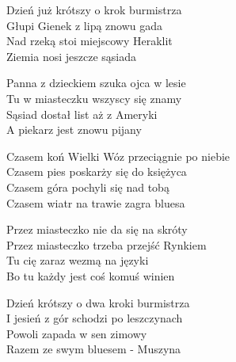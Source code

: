 \begin{text}
    Dzień już krótszy o krok burmistrza\\
    Głupi Gienek z lipą znowu gada\\
    Nad rzeką stoi miejscowy Heraklit\\
    Ziemia nosi jeszcze sąsiada

    Panna z dzieckiem szuka ojca w lesie\\
    Tu w miasteczku wszyscy się znamy\\
    Sąsiad dostał list aż z Ameryki\\
    A piekarz jest znowu pijany

    Czasem koń Wielki Wóz przeciągnie po niebie\\
    Czasem pies poskarży się do księżyca\\
    Czasem góra pochyli się nad tobą\\
    Czasem wiatr na trawie zagra bluesa

    Przez miasteczko nie da się na skróty\\
    Przez miasteczko trzeba przejść Rynkiem\\
    Tu cię zaraz wezmą na języki\\
    Bo tu każdy jest coś komuś winien

    Dzień krótszy o dwa kroki burmistrza\\
    I jesień z gór schodzi po leszczynach\\
    Powoli zapada w sen zimowy\\
    Razem ze swym bluesem - Muszyna
\end{text}
\begin{chord}

\end{chord}